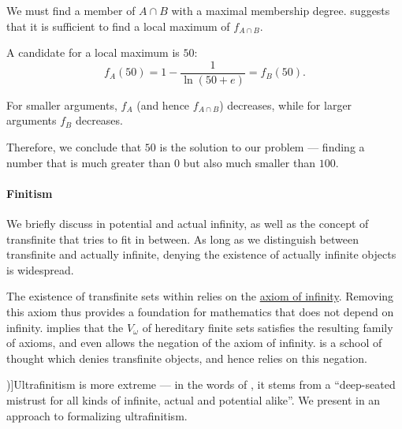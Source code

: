 \begin{example}
  We must find a member of \( A \cap B \) with a maximal membership degree.  suggests that it is sufficient to find a local maximum of \( f_{A \cap B} \).

  A candidate for a local maximum is \( 50 \):
  \begin{equation*}
    f_A(50) = 1 - \frac 1 {\ln(50 + e)} = f_B(50).
  \end{equation*}

  For smaller arguments, \( f_A \) (and hence \( f_{A \cap B} \)) decreases, while for larger arguments \( f_B \) decreases.

  Therefore, we conclude that \( 50 \) is the solution to our problem --- finding a number that is much greater than \( 0 \) but also much smaller than \( 100 \).
\end{example}

\paragraph{Finitism}

\begin{concept}\label{con:finitism}
  We briefly discuss in  potential and actual infinity, as well as the concept of transfinite that tries to fit in between. As long as we distinguish between transfinite and actually infinite, denying the existence of actually infinite objects is widespread.

  The existence of transfinite sets within \hyperref[def:zfc]{} relies on the \hyperref[def:zfc/infinity]{axiom of infinity}. Removing this axiom thus provides a foundation for mathematics that does not depend on infinity.  implies that the \hyperref[def:universe_of_hereditary_finite_sets]{\( V_\omega \)} of hereditary finite sets satisfies the resulting family of axioms, and even allows the negation of the axiom of infinity.  is a school of thought which denies transfinite objects, and hence relies on this negation.

  \term[en=ultrafinitism (\cite[2]{MannucciCherubin2006UltrafinitismI})]{Ultrafinitism} is more extreme --- in the words of , it stems from a \enquote{deep-seated mistrust for all kinds of infinite, actual and potential alike}. We present in  an approach to formalizing ultrafinitism.
\end{concept}

